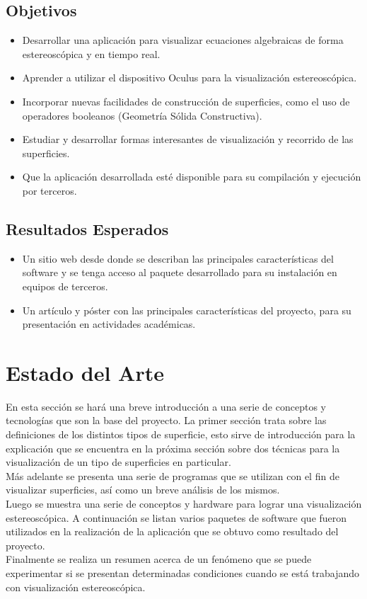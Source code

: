 \documentclass[12pt]{article}
\begin{document}
\subsection{Objetivos}
\begin{itemize}
\item Desarrollar una aplicación para visualizar ecuaciones algebraicas de forma estereoscópica y en tiempo real.
\item Aprender a utilizar el dispositivo Oculus para la visualización estereoscópica. 
\item Incorporar nuevas facilidades de construcción de superficies, como el uso de operadores booleanos (Geometría Sólida Constructiva). 
\item Estudiar y desarrollar formas interesantes de visualización y recorrido de las superficies.
\item Que la aplicación desarrollada esté disponible para su compilación y ejecución por terceros. 
\end{itemize}
\subsection{Resultados Esperados}
\begin{itemize}
\item Un sitio web desde donde se describan las principales características del software y se tenga acceso al paquete desarrollado para su instalación en equipos de terceros. 
\item Un artículo y póster con las principales características del proyecto, para su presentación en actividades académicas.
\end{itemize}

\clearpage
\section{Estado del Arte}
En esta sección se hará una breve introducción a una serie de conceptos y tecnologías que son la base del proyecto. La primer sección trata sobre las definiciones de los distintos tipos de superficie, esto sirve de introducción para la explicación que se encuentra en la próxima sección sobre dos técnicas para la visualización de un tipo de superficies en particular. 
\\Más adelante se presenta una serie de programas que se utilizan con el fin de visualizar superficies, así como un breve análisis de los mismos.
\\Luego se muestra una serie de conceptos y hardware para lograr una visualización estereoscópica. A continuación se listan varios paquetes de software que fueron utilizados en la realización de la aplicación que se obtuvo como resultado del proyecto.
\\Finalmente se realiza un resumen acerca de un fenómeno que se puede experimentar si se presentan determinadas condiciones cuando se está trabajando con visualización estereoscópica.
\end{document}
